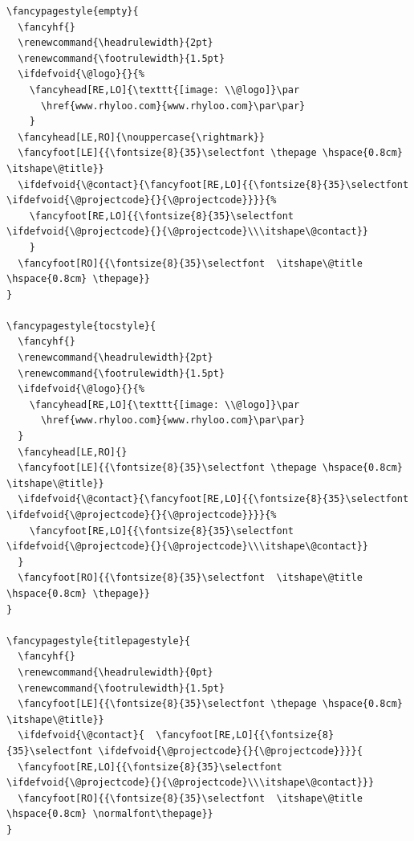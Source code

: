 \documentclass[english]{reporti}
\begin{document}
\begin{verbatim}
\fancypagestyle{empty}{
  \fancyhf{}
  \renewcommand{\headrulewidth}{2pt}
  \renewcommand{\footrulewidth}{1.5pt}
  \ifdefvoid{\@logo}{}{%
    \fancyhead[RE,LO]{\texttt{[image: \\@logo]}\par
      \href{www.rhyloo.com}{www.rhyloo.com}\par\par}
    }
  \fancyhead[LE,RO]{\nouppercase{\rightmark}}
  \fancyfoot[LE]{{\fontsize{8}{35}\selectfont \thepage \hspace{0.8cm} \itshape\@title}}
  \ifdefvoid{\@contact}{\fancyfoot[RE,LO]{{\fontsize{8}{35}\selectfont \ifdefvoid{\@projectcode}{}{\@projectcode}}}}{%
    \fancyfoot[RE,LO]{{\fontsize{8}{35}\selectfont \ifdefvoid{\@projectcode}{}{\@projectcode}\\\itshape\@contact}}
    }
  \fancyfoot[RO]{{\fontsize{8}{35}\selectfont  \itshape\@title \hspace{0.8cm} \thepage}}
}

\fancypagestyle{tocstyle}{
  \fancyhf{}
  \renewcommand{\headrulewidth}{2pt}
  \renewcommand{\footrulewidth}{1.5pt}
  \ifdefvoid{\@logo}{}{%
    \fancyhead[RE,LO]{\texttt{[image: \\@logo]}\par
      \href{www.rhyloo.com}{www.rhyloo.com}\par\par}
  }
  \fancyhead[LE,RO]{}
  \fancyfoot[LE]{{\fontsize{8}{35}\selectfont \thepage \hspace{0.8cm} \itshape\@title}}
  \ifdefvoid{\@contact}{\fancyfoot[RE,LO]{{\fontsize{8}{35}\selectfont \ifdefvoid{\@projectcode}{}{\@projectcode}}}}{%
    \fancyfoot[RE,LO]{{\fontsize{8}{35}\selectfont \ifdefvoid{\@projectcode}{}{\@projectcode}\\\itshape\@contact}}
  }
  \fancyfoot[RO]{{\fontsize{8}{35}\selectfont  \itshape\@title \hspace{0.8cm} \thepage}}
}

\fancypagestyle{titlepagestyle}{
  \fancyhf{}
  \renewcommand{\headrulewidth}{0pt}
  \renewcommand{\footrulewidth}{1.5pt}
  \fancyfoot[LE]{{\fontsize{8}{35}\selectfont \thepage \hspace{0.8cm} \itshape\@title}}
  \ifdefvoid{\@contact}{  \fancyfoot[RE,LO]{{\fontsize{8}{35}\selectfont \ifdefvoid{\@projectcode}{}{\@projectcode}}}}{
  \fancyfoot[RE,LO]{{\fontsize{8}{35}\selectfont \ifdefvoid{\@projectcode}{}{\@projectcode}\\\itshape\@contact}}}
  \fancyfoot[RO]{{\fontsize{8}{35}\selectfont  \itshape\@title \hspace{0.8cm} \normalfont\thepage}}
}
\end{verbatim}
\end{document}
